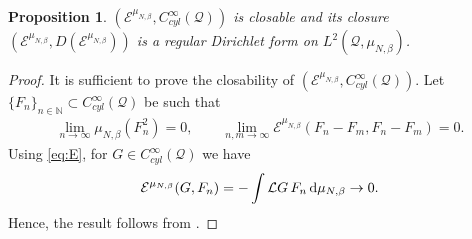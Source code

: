 \documentclass[11pt,UTF-8,reqno]{amsart}
\numberwithin{equation}{section}
\newtheorem{proposition}[theorem]{Proposition}
\def\dif{{\mathord{{\rm d}}}}
\def\cE{{\mathcal E}}
\def\cL{{\mathcal L}}
\def\cQ{{\mathcal Q}}
\def\mN{{\mathbb N}}
\def\dif{{\mathord{{\rm d}}}}
\def\bp{\begin{proposition}}
\def\ep{\end{proposition}}
\begin{document}
\bp\label{th:D}
$(\cE^{\mu_{N,\beta}},C^\infty_{cyl}(\cQ))$ is closable and its closure $(\cE^{\mu_{N,\beta}},D(\cE^{\mu_{N,\beta}}))$ is a regular Dirichlet form on $L^2(\cQ,\mu_{N,\beta})$.
\ep



\begin{proof}
It is sufficient to prove the closability of $(\cE^{\mu_{N,\beta}},C^\infty_{cyl}(\cQ))$.
Let $\{F_n\}_{n\in \mN}\subset C^\infty_{cyl}(\cQ)$ be such that
\begin{align*}
\lim_{n\to\infty}\mu_{N,\beta}(F^2_n)=0,
\qquad \lim_{n,m\to\infty}\cE^{\mu_{N,\beta}}(F_n-F_m,F_n-F_m)=0.
\end{align*}
Using \eqref{eq:E}, for $G\in C^\infty_{cyl}(\cQ)$ we have
\begin{align*}
	\cE^{\mu_{N,\beta}}(G,F_n)=-\int \cL G \, F_n \, \dif \mu_{N,\beta}\to0.
\end{align*}
Hence, the result follows from \cite[Chapter I. Lemma 3.4]{MaRockner}.
\end{proof}
\end{document}
